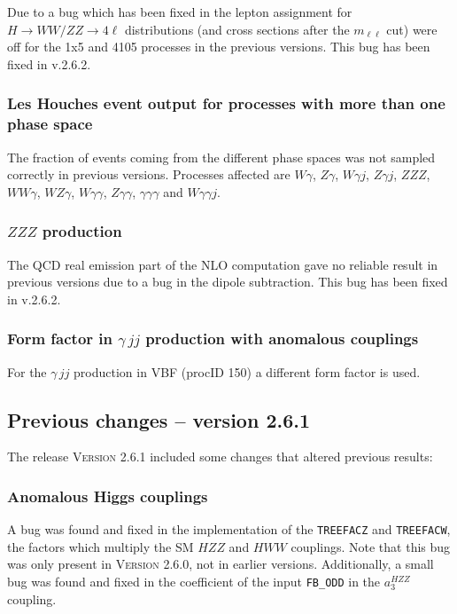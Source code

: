 \documentclass[english,12pt]{article}
\begin{document}
Due to a bug which has been fixed in the lepton assignment for $H\to WW/ZZ \to 4\ell$ distributions
(and cross sections after the $m_{\ell\ell}$ cut) were off for the 1x5 and 4105 processes
in the previous versions. This bug has been fixed in v.2.6.2.

\subsubsection{Les Houches event output for processes with more than one phase space}

The fraction of events coming from the different phase spaces was not sampled correctly 
in previous versions. Processes affected are $W\gamma$, $Z\gamma$, $W\gamma j$,
$Z\gamma j$, $ZZZ$, $WW\gamma$, $WZ\gamma$, $W\gamma\gamma$, $Z\gamma\gamma$,
$\gamma\gamma\gamma$ and $W\gamma\gamma j$.

\subsubsection{$ZZZ$ production}

The QCD real emission part of the NLO computation gave no reliable result in previous versions
due to a bug in the dipole subtraction. This bug has been fixed in v.2.6.2.

\subsubsection{Form factor in $\gamma\,jj$ production with anomalous couplings}

 For the $\gamma\,jj$ production in VBF (procID 150) a different form factor is used.



\subsection{Previous changes -- version 2.6.1}

The release \textsc{Version 2.6.1} included some changes that altered previous results:

\subsubsection{Anomalous Higgs couplings}

A bug was found and fixed in the implementation of the {\tt TREEFACZ} and {\tt TREEFACW}, 
the factors which multiply the SM $HZZ$ and $HWW$ couplings.  Note that this bug was only 
present in \textsc{Version 2.6.0}, not in earlier versions.  Additionally, a small bug was 
found and fixed in the coefficient of the input {\tt FB\_ODD} in the $a_{3}^{HZZ}$ coupling.
\end{document}
